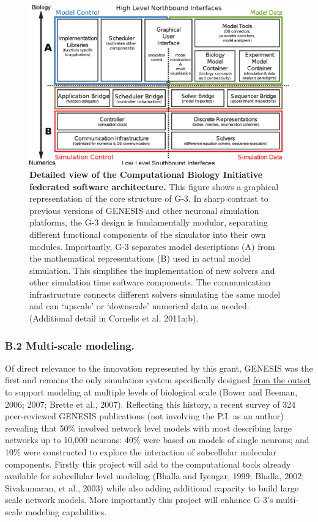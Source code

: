\documentclass[12pt]{article}
\begin{document}
\begin{figure}
\includegraphics[scale=0.56]{figures/cbi-architecture-expanded.eps}
\caption{\footnotesize {\bf Detailed view of the Computational Biology Initiative
    federated software architecture.}  This figure shows a graphical
  representation of the core structure of G-3. In sharp contrast to
  previous versions of GENESIS and other neuronal simulation
  platforms, the G-3 design is fundamentally modular, separating
  different functional components of the simulator into their own
  modules. Importantly, G-3 separates model descriptions (A) from the
  mathematical representations (B) used in actual model simulation. This
  simplifies the implementation of new solvers and other
  simulation time software components. The communication infrastructure
  connects different solvers simulating the same model and can
  `upscale' or `downscale' numerical data as needed. (Additional
  detail in Cornelis et al. 2011a;b).}
\label{fig:cbi-architecture-expanded}
\end{figure}

\subsubsection*{B.2 Multi-scale modeling.}

\noindent Of direct relevance to the innovation represented by this
grant, GENESIS was the first and remains the only simulation system
specifically designed \underline{from the outset} to support modeling
at multiple levels of biological scale (Bower and Beeman, 2006; 2007;
Brette et al., 2007). Reflecting this history, a recent survey of 324
peer-reviewed GENESIS publications (not involving the P.I. as an
author) revealing that 50\% involved network level models with most
describing large networks up to 10,000 neurons: 40\% were based on
models of single neurons; and 10\% were constructed to explore the
interaction of subcellular molecular components.  Firstly this project
will add to the computational tools already available for subcellular
level modeling (Bhalla and Iyengar, 1999; Bhalla, 2002; Sivakumaran,
et al., 2003) while also adding additional capacity to build large
scale network models.  More importantly this project will enhance
G-3's multi-scale modeling capabilities.
\end{document}
